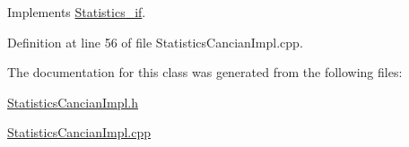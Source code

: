 Implements \hyperlink{class_statistics__if_ae0ad6bf18f8263003b0ac7552318be57}{Statistics\-\_\-if}.



Definition at line 56 of file Statistics\-Cancian\-Impl.\-cpp.



The documentation for this class was generated from the following files\-:\begin{DoxyCompactItemize}
\item 
\hyperlink{_statistics_cancian_impl_8h}{Statistics\-Cancian\-Impl.\-h}\item 
\hyperlink{_statistics_cancian_impl_8cpp}{Statistics\-Cancian\-Impl.\-cpp}\end{DoxyCompactItemize}
